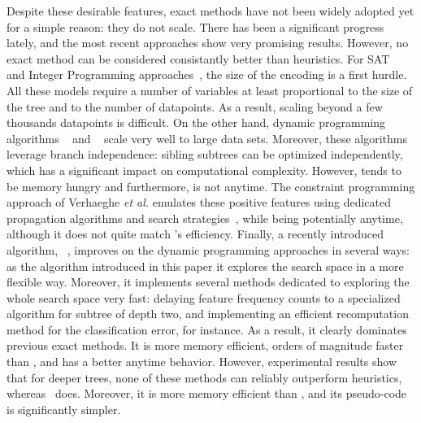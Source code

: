 \documentclass{article}
\begin{document}
Despite these desirable features, exact methods have not been widely adopted yet for a simple reason: they do not scale. There has been a significant progress lately, and the most recent approaches show very promising results. However, no exact method can be considered consistantly better than heuristics. 
For SAT~\cite{avellanedaefficient,narodytska2018learning} and Integer Programming approaches~\cite{aghaei2020learning,bertsimas2017optimal,bertsimas2007classification,verwer2019learning}, the size of the encoding is a first hurdle. All these models require a number of variables at least proportional to the size of the tree and to the number of datapoints. As a result, scaling beyond a few thousands datapoints is difficult. 
On the other hand, dynamic programming algorithms \olddleight~\cite{dl8} and \dleight~\cite{dl85} scale very well to large data sets. Moreover, these algorithms leverage branch independence: sibling subtrees can be optimized independently, which has a significant impact on computational complexity. However, \dleight tends to be memory hungry and furthermore, is not anytime.
The constraint programming approach of Verhaeghe \textit{et al.} emulates these positive features using dedicated propagation algorithms and search strategies~\cite{verhaeghe2019learning}, while being potentially anytime, although it does not quite match \dleight's efficiency.
Finally, a recently introduced algorithm, \murtree~\cite{DBLP:journals/corr/abs-2007-12652}, improves on the dynamic programming approaches in several ways: as the algorithm introduced in this paper it explores the search space in a more flexible way. Moreover, it implements several methods dedicated to exploring the whole search space very fast: delaying feature frequency counts to a specialized algorithm for subtree of depth two, and implementing an efficient recomputation method for the classification error, for instance.
As a result, it clearly dominates previous exact methods. It is more memory efficient, orders of magnitude faster than \dleight, and has a better anytime behavior. However, experimental results show that for deeper trees, none of these methods can reliably outperform heuristics, whereas \budalg\ does. Moreover, it is more memory efficient than \murtree, and its pseudo-code is significantly simpler.
 

%
\end{document}
